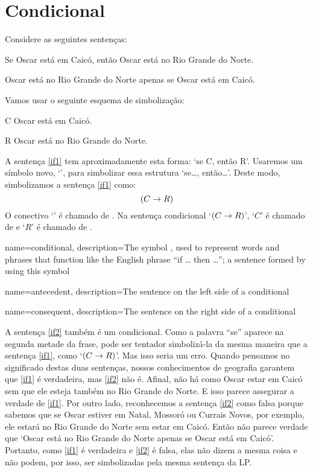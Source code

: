 \section{Condicional}
Considere as seguintes sentenças:
	\begin{earg}
		\item[\ex{if1}] Se Oscar está em Caicó, então Oscar está no Rio Grande do Norte.
		\item[\ex{if2}] Oscar está no Rio Grande do Norte apenas se Oscar está em Caicó.
	\end{earg}
Vamos usar o seguinte esquema de simbolização:
	\begin{ekey}
		\item[C] Oscar está em Caicó.
		\item[R] Oscar está no Rio Grande do Norte.
	\end{ekey}
A sentença \ref{if1} tem aproximadamente esta forma: `se C, então R'.
Usaremos um símbolo novo, `\eif', para simbolizar essa estrutura `se\ldots, então\ldots'.
Deste modo, simbolizamos a sentença \ref{if1} como:
$$(C \rightarrow R)$$
O conectivo `\eif' é chamado de .
Na sentença condicional `$(C \rightarrow R)$', `$C$' é chamado de  e `$R$' é chamado de .

{
name=conditional,
description={The symbol \eif, used to represent words and phrases that function like the English phrase ``if \dots{} then \dots''; a sentence formed by using this symbol}
}

{
name=antecedent,
description={The sentence on the left side of a \gls{conditional}}
}


{
name=consequent,
description={The sentence on the right side of a \gls{conditional}}
}

A sentença \ref{if2} também é um condicional.
Como a palavra ``se'' aparece na segunda metade da frase, pode ser tentador simbolizá-la da mesma maneira que a sentença \ref{if1}, como `$(C \rightarrow R)$'.
Mas isso seria um erro.
Quando pensamos no significado destas duas sentenças, nossos conhecimentos de geografia garantem que \ref{if1} é verdadeira, mas \ref{if2} não é.
Afinal, não há como Oscar estar em Caicó sem que ele esteja também no Rio Grande do Norte.
E isso parece assegurar a verdade de \ref{if1}.
Por outro lado, reconhecemos a sentença \ref{if2} como falsa porque sabemos que se Oscar estiver em Natal, Mossoró ou Currais Novos, por exemplo, ele estará no Rio Grande do Norte sem estar em Caicó.
Então não parece verdade que `Oscar está no Rio Grande do Norte apenas se Oscar está em Caicó'.
Portanto, como \ref{if1} é verdadeira e \ref{if2} é falsa, elas não dizem a mesma coisa e não podem, por isso, ser simbolizadas pela mesma sentença da  LP.

